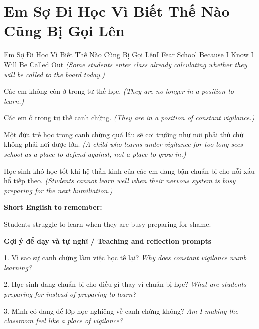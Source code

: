 \section{Em Sợ Đi Học Vì Biết Thế Nào Cũng Bị Gọi Lên}
\begin{truyen}{Em Sợ Đi Học Vì Biết Thế Nào Cũng Bị Gọi Lên}{I Fear School Because I Know I Will Be Called Out}
\textit{(Some students enter class already calculating whether they will be called to the board today.)}

Các em không còn ở trong tư thế học.
\textit{(They are no longer in a position to learn.)}

Các em ở trong tư thế canh chừng.
\textit{(They are in a position of constant vigilance.)}

Một đứa trẻ học trong canh chừng quá lâu sẽ coi trường như nơi phải thủ chứ không phải nơi được lớn.
\textit{(A child who learns under vigilance for too long sees school as a place to defend against, not a place to grow in.)}

\end{truyen}

\begin{baihoc}
Học sinh khó học tốt khi hệ thần kinh của các em đang bận chuẩn bị cho nỗi xấu hổ tiếp theo.
\textit{(Students cannot learn well when their nervous system is busy preparing for the next humiliation.)}
\end{baihoc}

\begin{ghinhoanh}
\textbf{Short English to remember:}

Students struggle to learn when they are busy preparing for shame.

\end{ghinhoanh}

\begin{tuhocnhanh}
\textbf{Gợi ý để dạy và tự nghĩ / Teaching and reflection prompts}

1. Vì sao sự canh chừng làm việc học tê lại? \textit{Why does constant vigilance numb learning?}

2. Học sinh đang chuẩn bị cho điều gì thay vì chuẩn bị học? \textit{What are students preparing for instead of preparing to learn?}

3. Mình có đang để lớp học nghiêng về canh chừng không? \textit{Am I making the classroom feel like a place of vigilance?}
\end{tuhocnhanh}
\ngancach

